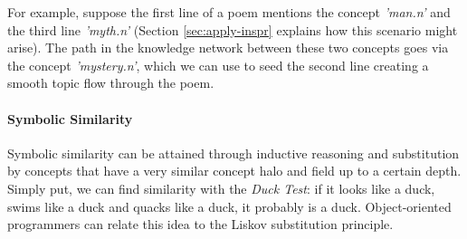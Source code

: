 For example, suppose the first line of a poem mentions the concept \textit{'man.n'} and the third line \textit{'myth.n'} (Section \ref{sec:apply-inspr} explains how this scenario might arise). The path in the knowledge network between these two concepts goes via the concept \textit{'mystery.n'}, which we can use to seed the second line creating a smooth topic flow through the poem.


\paragraph{Symbolic Similarity}
Symbolic similarity can be attained through inductive reasoning and substitution by concepts that have a very similar concept halo and field up to a certain depth. Simply put, we can find similarity with the \textit{Duck Test}: if it looks like a duck, swims like a duck and quacks like a duck, it probably is a duck. Object-oriented programmers can relate this idea to the Liskov substitution principle.

